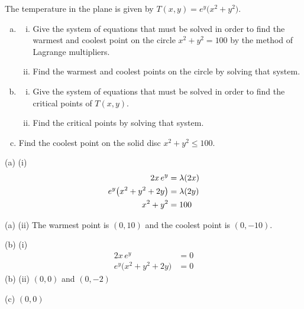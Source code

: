 \begin{question}[M200 2016D] %
\item %
The temperature in the plane is given by $T(x,y) = e^y\big(x^2+y^2\big)$.
\begin{enumerate}[(a)]
\item
\begin{enumerate}[(i)]
\item
Give the system of equations that must be solved in order to find the 
warmest and coolest point on the circle $x^2+y^2=100$ by the method
of Lagrange multipliers.
\item 
Find the warmest and coolest points on the circle by solving that system.
\end{enumerate}

\item 
\begin{enumerate}[(i)]
\item
Give the system of equations that must be solved in order to find the
critical points of $T(x,y)$.
\item
Find the critical points by solving that system.
\end{enumerate}

\item
Find the coolest point on the solid disc $x^2+y^2\le 100$.

\end{enumerate}
\end{question}

%

\begin{answer}
(a) (i)
\begin{align*}
 2x\,e^y &=\lambda (2x) \\
e^y\big(x^2+y^2+2y\big) &=\lambda (2y) \\
x^2+y^2&=100 
\end{align*}

(a) (ii)  The warmest point is $(0,10)$ and the coolest point is $(0,-10)$.

(b) (i)
\begin{align*}
2x\,e^y &=0 \\
e^y\big(x^2+y^2+2y\big) &=0  
\end{align*} 
(b) (ii) $(0,0)$ and $(0,-2)$

(c) $(0,0)$
\end{answer}

